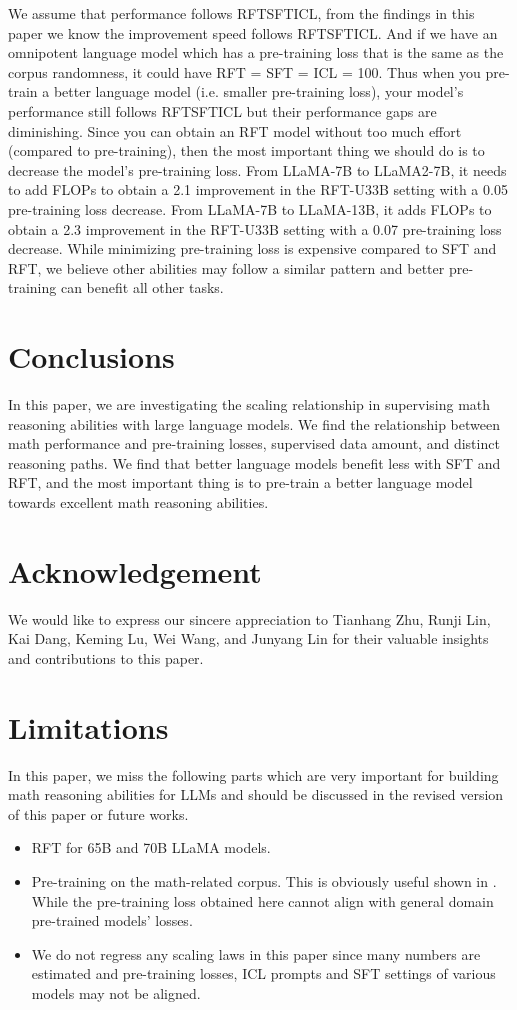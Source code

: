 \documentclass{article} \usepackage{iclr2021_conference,times}
\begin{document}
We assume that performance follows RFTSFTICL, from the findings in this paper we know the improvement speed follows RFTSFTICL. And if we have an omnipotent language model which has a pre-training loss that is the same as the corpus randomness, it could have RFT = SFT = ICL = 100.
Thus when you pre-train a better language model (i.e. smaller pre-training loss), your model's performance still follows RFTSFTICL but their performance gaps are diminishing.
Since you can obtain an RFT model without too much effort (compared to pre-training), then the most important thing we should do is to decrease the model's pre-training loss.
From LLaMA-7B to LLaMA2-7B, it needs to add  FLOPs to obtain a 2.1 improvement in the RFT-U33B setting with a 0.05 pre-training loss decrease.
From LLaMA-7B to LLaMA-13B, it adds  FLOPs to obtain a 2.3 improvement in the RFT-U33B setting with a 0.07 pre-training loss decrease.
While minimizing pre-training loss is expensive compared to SFT and RFT, we believe other abilities may follow a similar pattern and better pre-training can benefit all other tasks.

\section{Conclusions}
In this paper, we are investigating the scaling relationship in supervising math reasoning abilities with large language models.
We find the relationship between math performance and pre-training losses, supervised data amount, and distinct reasoning paths.
We find that better language models benefit less with SFT and RFT, and the most important thing is to pre-train a better language model towards excellent math reasoning abilities.

\section{Acknowledgement}
We would like to express our sincere appreciation to Tianhang Zhu, Runji Lin, Kai Dang, Keming Lu, Wei Wang, and Junyang Lin for their valuable insights and contributions to this paper.

\section{Limitations}
In this paper, we miss the following parts which are very important for building math reasoning abilities for LLMs and should be discussed in the revised version of this paper or future works.
\begin{itemize}
    \item RFT for 65B and 70B LLaMA models.
    \item Pre-training on the math-related corpus. This is obviously useful shown in \cite{lewkowycz2022solving}. While the pre-training loss obtained here cannot align with general domain pre-trained models' losses.
    \item We do not regress any scaling laws in this paper since many numbers are estimated and pre-training losses, ICL prompts and SFT settings of various models may not be aligned.
\end{itemize}
\end{document}
